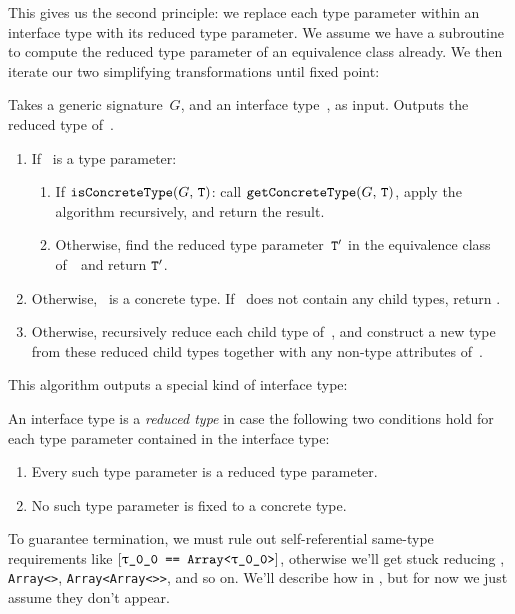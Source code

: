 \documentclass[../generics]{subfiles}
\begin{document}
This gives us the second principle: we replace each type parameter within an interface type with its reduced type parameter. We assume we have a subroutine to compute the reduced type parameter of an equivalence class already. We then iterate our two simplifying transformations until fixed point:

\begin{algorithm}\label{reduced type algorithm}
Takes a generic signature~$G$, and an interface type~\tT, as input. Outputs the reduced type of~\tT.
\begin{enumerate}
\item If \tT\ is a type parameter:
\begin{enumerate}
\item If $\texttt{isConcreteType}(G,\,\texttt{T})$: call $\texttt{getConcreteType}(G,\,\texttt{T})$, apply the algorithm recursively, and return the result.
\item Otherwise, find the reduced type parameter~$\texttt{T}^\prime$ in the equivalence class of~\tT\ and return $\texttt{T}^\prime$.
\end{enumerate}
\item Otherwise, \tT\ is a concrete type. If \tT\ does not contain any child types, return \tT.
\item Otherwise, recursively reduce each child type of~\tT, and construct a new type from these reduced child types together with any non-type attributes of~\tT.
\end{enumerate}
\end{algorithm}

This algorithm outputs a special kind of interface type:

\begin{definition}
An interface type is a \emph{reduced type} in case the following two conditions hold for each type parameter contained in the interface type:
\begin{enumerate}
\item Every such type parameter is a reduced type parameter.
\item No such type parameter is fixed to a concrete type.
\end{enumerate}
\end{definition}

To guarantee termination, we must rule out self-referential same-type requirements like $\SameReq{\rT}{Array<\rT>}$, otherwise we'll get stuck reducing \rT, \texttt{Array<\rT>}, \texttt{Array<Array<\rT>>}, and so on. We'll describe how in , but for now we just assume they don't appear. 
\end{document}
